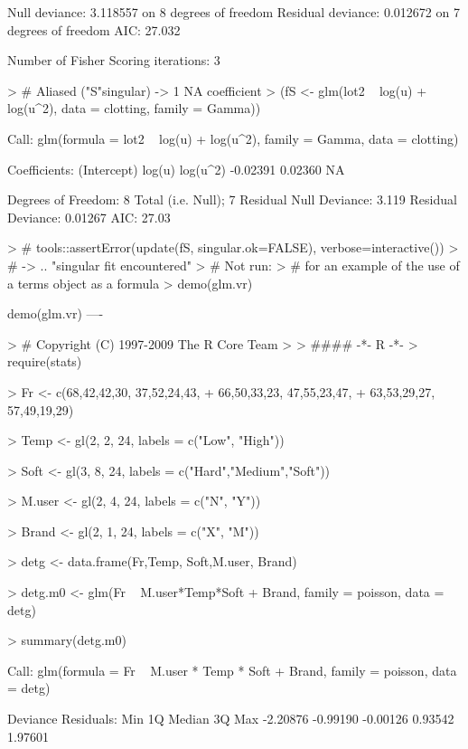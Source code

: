 \documentclass{article}
\begin{document}
\begin{Schunk}
\begin{Soutput}
    Null deviance: 3.118557  on 8  degrees of freedom
Residual deviance: 0.012672  on 7  degrees of freedom
AIC: 27.032

Number of Fisher Scoring iterations: 3
\end{Soutput}
\begin{Sinput}
> # Aliased ("S"singular) -> 1 NA coefficient
> (fS <- glm(lot2 ~ log(u) + log(u^2), data = clotting, family = Gamma))
\end{Sinput}
\begin{Soutput}
Call:  glm(formula = lot2 ~ log(u) + log(u^2), family = Gamma, data = clotting)

Coefficients:
(Intercept)       log(u)     log(u^2)  
   -0.02391      0.02360           NA  

Degrees of Freedom: 8 Total (i.e. Null);  7 Residual
Null Deviance:	    3.119 
Residual Deviance: 0.01267 	AIC: 27.03
\end{Soutput}
\begin{Sinput}
> # tools::assertError(update(fS, singular.ok=FALSE), verbose=interactive()) 
> # -> .. "singular fit encountered"
> # Not run: 
> # for an example of the use of a terms object as a formula
> demo(glm.vr)
\end{Sinput}
\begin{Soutput}
	demo(glm.vr)
	---- ~~~~~~

> #  Copyright (C) 1997-2009 The R Core Team
> 
> #### -*- R -*-
> require(stats)

> Fr <- c(68,42,42,30, 37,52,24,43,
+ 	66,50,33,23, 47,55,23,47,
+ 	63,53,29,27, 57,49,19,29)

> Temp <- gl(2, 2, 24, labels = c("Low", "High"))

> Soft <- gl(3, 8, 24, labels = c("Hard","Medium","Soft"))

> M.user <- gl(2, 4, 24, labels = c("N", "Y"))

> Brand <- gl(2, 1, 24, labels = c("X", "M"))

> detg <- data.frame(Fr,Temp, Soft,M.user, Brand)

> detg.m0 <- glm(Fr ~ M.user*Temp*Soft + Brand, family = poisson, data = detg)

> summary(detg.m0)

Call:
glm(formula = Fr ~ M.user * Temp * Soft + Brand, family = poisson, 
    data = detg)

Deviance Residuals: 
     Min        1Q    Median        3Q       Max  
-2.20876  -0.99190  -0.00126   0.93542   1.97601  


\end{Soutput}
\end{Schunk}
\end{document}
